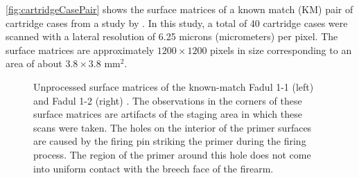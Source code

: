 \autoref{fig:cartridgeCasePair} shows the surface matrices of a known
match (KM) pair of cartridge cases from a study by
\citet{fadul_empirical_2011}. In this study, a total of 40 cartridge
cases were scanned with a lateral resolution of 6.25 microns
(micrometers) per pixel. The surface matrices are approximately
\(1200 \times 1200\) pixels in size corresponding to an area of about
\(3.8 \times 3.8\) mm\(^2\).

\begin{Schunk}
\begin{figure}[htbp]

{\centering {}

}

\caption{\label{fig:cartridgeCasePair} Unprocessed surface matrices of the known-match Fadul 1-1 (left) and Fadul 1-2 (right) \citep{fadul_empirical_2011}. The observations in the corners of these surface matrices are artifacts of the staging area in which these scans were taken. The holes on the interior of the primer surfaces are caused by the firing pin striking the primer during the firing process. The region of the primer around this hole does not come into uniform contact with the breech face of the firearm.}\label{fig:rawBFs}
\end{figure}
\end{Schunk}

